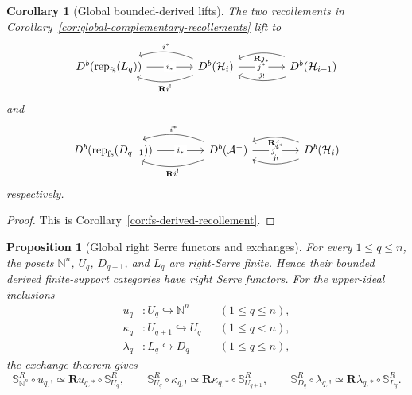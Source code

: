 \documentclass[12pt,reqno]{amsart}
\newtheorem{proposition}[theorem]{Proposition}
\newtheorem{corollary}[theorem]{Corollary}
\theoremstyle{definition}
\theoremstyle{remark}
\newcommand{\Rep}{\operatorname{rep}}
\begin{document}
\begin{corollary}[Global bounded-derived lifts]
\label{cor:global-derived-recollements}
The two recollements in
Corollary~\ref{cor:global-complementary-recollements} lift to
\[
\begin{tikzcd}[column sep=4.2em]
D^b\!\left(\Rep_{\mathrm{fs}}(L_q)\right)
  \arrow[r, "i_*" description]
& D^b(\mathcal H_i)
  \arrow[l, bend right=20, "i^*"']
  \arrow[l, bend left=20, "\mathbf R i^!"]
  \arrow[r, "j^*" description]
& D^b(\mathcal H_{i-1})
  \arrow[l, bend left=20, "j_!"']
  \arrow[l, bend right=20, "\mathbf R j_*"]
\end{tikzcd}
\]
and
\[
\begin{tikzcd}[column sep=4.2em]
D^b\!\left(\Rep_{\mathrm{fs}}(D_{q-1})\right)
  \arrow[r, "i_*" description]
& D^b(\mathcal A^-)
  \arrow[l, bend right=20, "i^*"']
  \arrow[l, bend left=20, "\mathbf R i^!"]
  \arrow[r, "j^*" description]
& D^b(\mathcal H_i)
  \arrow[l, bend left=20, "j_!"']
  \arrow[l, bend right=20, "\mathbf R j_*"]
\end{tikzcd}
\]
respectively.
\end{corollary}

\begin{proof}
This is Corollary~\ref{cor:fs-derived-recollement}.
\end{proof}

\begin{proposition}[Global right Serre functors and exchanges]
\label{prop:global-right-serre}
For every $1\le q\le n$, the posets
$\mathbb N^n$, $U_q$, $D_{q-1}$, and $L_q$ are right-Serre finite.  Hence
their bounded derived finite-support categories have right Serre functors.
For the upper-ideal inclusions
\[
\begin{aligned}
u_q&:U_q\hookrightarrow\mathbb N^n &&(1\le q\le n),\\
\kappa_q&:U_{q+1}\hookrightarrow U_q &&(1\le q<n),\\
\lambda_q&:L_q\hookrightarrow D_q &&(1\le q\le n),
\end{aligned}
\]
the exchange theorem gives
\[
\mathbb S_{\mathbb N^n}^R\circ u_{q,!}
\simeq\mathbf Ru_{q,*}\circ\mathbb S_{U_q}^R,
\qquad
\mathbb S_{U_q}^R\circ\kappa_{q,!}
\simeq\mathbf R\kappa_{q,*}\circ\mathbb S_{U_{q+1}}^R,
\qquad
\mathbb S_{D_q}^R\circ\lambda_{q,!}
\simeq\mathbf R\lambda_{q,*}\circ\mathbb S_{L_q}^R.
\]
\end{proposition}
\end{document}
